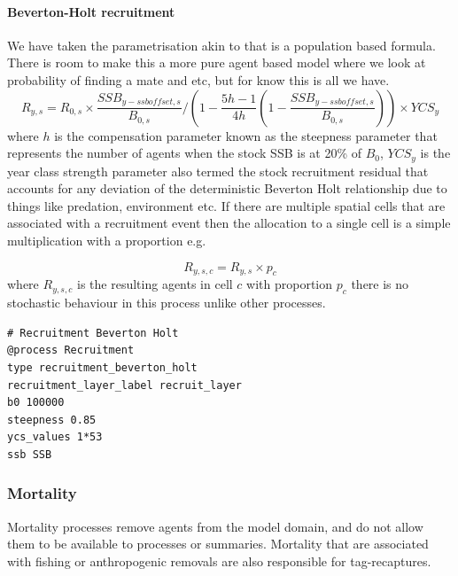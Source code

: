 \paragraph{Beverton-Holt recruitment}\label{subsubsec:bev-holt-recruitment}

We have taken the parametrisation akin to \cite{mace_doonan_88} that is a population based formula. There is room to make this a more pure agent based model where we look at probability of finding a mate and etc, but for know this is all we have.
\begin{equation}
R_{y,s} = R_{0,s} \times \frac{SSB_{y-ssb offset,s}}{B_{0,s}}/ \left(1 - \frac{5h - 1}{4h} \left( 1 - \frac{SSB_{y-ssb offset,s}}{B_{0,s}}\right)\right) \times YCS_y
\end{equation}
where $h$ is the compensation parameter known as the steepness parameter that represents the number of agents when the stock SSB is at 20\% of $B_0$, $YCS_y$ is the year class strength parameter also termed the stock recruitment residual that accounts for any deviation of the deterministic Beverton Holt relationship due to things like predation, environment etc. If there are multiple spatial cells that are associated with a recruitment event then the allocation to a single cell is a simple multiplication with a proportion e.g.

\begin{equation}
R_{y,s,c} = R_{y,s} \times p_c
\end{equation}
where $R_{y,s,c}$ is the resulting agents in cell $c$ with proportion $p_c$ there is no stochastic behaviour in this process unlike other processes.

{\small{\begin{verbatim}
# Recruitment Beverton Holt
@process Recruitment
type recruitment_beverton_holt
recruitment_layer_label recruit_layer
b0 100000
steepness 0.85
ycs_values 1*53
ssb SSB
\end{verbatim}}}

\subsubsection{Mortality}\label{sec:mortality}
Mortality processes remove agents from the model domain, and do not allow them to be available to processes or summaries. Mortality that are associated with fishing or anthropogenic removals are also responsible for tag-recaptures.\\

